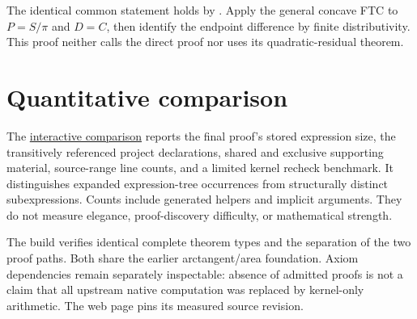 \begin{theorem}
\label{thm:cosine-comparison-ftc}
\leanok
The identical common statement holds by
.  Apply the general concave FTC
to $P=S/\pi$ and $D=C$, then identify the endpoint difference by finite
distributivity.  This proof neither calls the direct proof nor uses its
quadratic-residual theorem.
\end{theorem}

\section{Quantitative comparison}
The \href{proof-comparison/index.html}{interactive comparison} reports the
final proof's stored expression size, the transitively referenced project
declarations, shared and exclusive supporting material, source-range line
counts, and a limited kernel recheck benchmark.  It distinguishes expanded
expression-tree occurrences from structurally distinct subexpressions.
Counts include generated helpers and implicit arguments.  They do not
measure elegance, proof-discovery difficulty, or mathematical strength.

The build verifies identical complete theorem types and the separation of
the two proof paths.  Both share the earlier arctangent/area foundation.
Axiom dependencies remain separately inspectable: absence of admitted
proofs is not a claim that all upstream native computation was replaced by
kernel-only arithmetic.  The web page pins its measured source revision.
